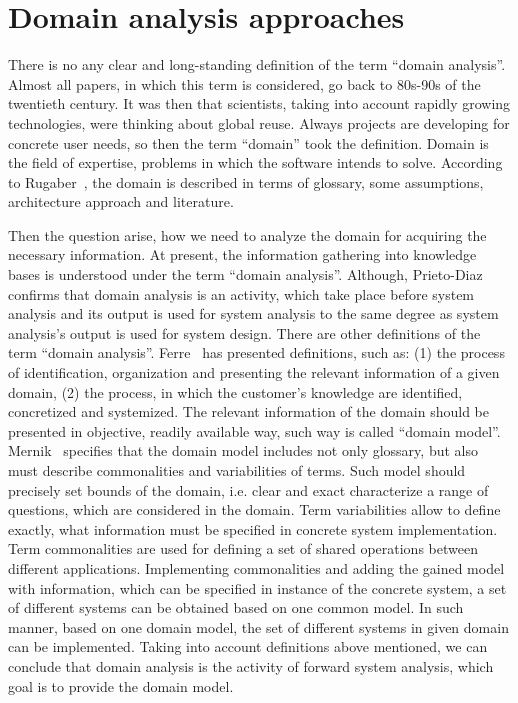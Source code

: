 \documentclass[conference]{IEEEtran}
\begin{document}
\section{Domain analysis approaches}
\label{chapter:approaches}
There is no any clear and long-standing definition of the term ``domain analysis''. Almost all papers, in which this term is considered, go back to 80s-90s of the twentieth century. It was then that scientists, taking into account rapidly growing technologies, were thinking about global reuse. Always projects are developing for concrete user needs, so then the term ``domain'' took the definition. Domain is the field of expertise, problems in which the software intends to solve. According to Rugaber~\cite{rugaber1994domain}, the domain is described in terms of glossary, some assumptions, architecture approach and literature. 

Then the question arise, how we need to analyze the domain for acquiring the necessary information. At present, the information gathering into knowledge bases is understood under the term ``domain analysis''. Although, Prieto-Diaz~\cite{prieto1988domain} confirms that domain analysis is an activity, which take place before system analysis and its output is used for system analysis to the same degree as system analysis’s output is used for system design.  There are other definitions of the term ``domain analysis''. Ferre~\cite{ferre1999evaluation} has presented definitions, such as: (1) the process of identification, organization and presenting the relevant information of a given domain, (2) the process, in which the customer’s knowledge are identified, concretized and systemized. The relevant information of the domain should be presented in objective, readily available way, such way is called ``domain model''. Mernik~\cite{mernik2005} specifies that the domain model includes not only glossary, but also must describe commonalities and variabilities of terms. Such model should precisely set bounds of the domain, i.e. clear and exact characterize a range of questions, which are considered in the domain. Term variabilities allow to define exactly, what information must be specified in concrete system implementation. Term commonalities are used for defining a set of shared operations between different applications. Implementing commonalities and adding the gained model  with information, which can be specified in instance of the concrete system, a set of different systems can be obtained based on one common model. In such manner, based on one domain model, the set of different systems in given domain can be implemented. Taking into account definitions above mentioned, we can conclude that domain analysis is the activity of forward system analysis, which goal is to provide the domain model. 
\end{document}
